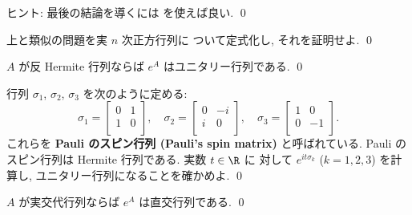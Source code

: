 \documentclass[12pt,twoside]{jarticle}
\begin{document}
\noindent
ヒント: 最後の結論を導くには  を使えば良い.
\qed


\begin{question}
  上と類似の問題を実 $n$ 次正方行列に
  ついて定式化し, それを証明せよ.
  \qed
\end{question}


\begin{question}
  $A$ が反 Hermite 行列ならば $e^A$ はユニタリー行列である.
  \qed
\end{question}


\begin{question}
\label{q:Pauli-spin-matrices}
  行列 $\sigma_1$, $\sigma_2$, $\sigma_3$ を次のように定める:
  \begin{equation*}
    \sigma_1=
    \begin{bmatrix}
      0 & 1 \\
      1 & 0 \\
    \end{bmatrix},
    \quad
    \sigma_2=
    \begin{bmatrix}
      0 & -i \\
      i & 0 \\
    \end{bmatrix},
    \quad
    \sigma_3=
    \begin{bmatrix}
      1 & 0 \\
      0 & -1 \\
    \end{bmatrix}.
  \end{equation*}
  これらを {\bf Pauli のスピン行列 (Pauli's spin matrix)} と呼ばれている. 
  Pauli のスピン行列は Hermite 行列である.  実数 $t\in\R$ に
  対して $e^{it\sigma_k}$ ($k=1,2,3$) を計算し, 
  ユニタリー行列になることを確かめよ. 
  \qed
\end{question}


\begin{question}
  $A$ が実交代行列ならば $e^A$ は直交行列である.
  \qed
\end{question}

\end{document}

